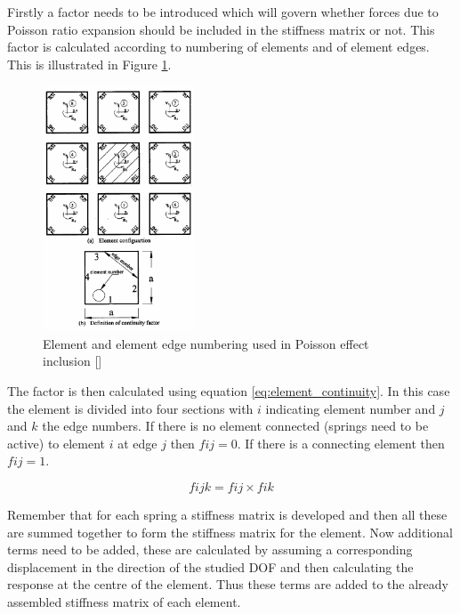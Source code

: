 Firstly a factor needs to be introduced which will govern whether forces due to Poisson ratio expansion should be included in the stiffness matrix or not.  This factor is calculated according to numbering of elements and of element edges.  This is illustrated in Figure \ref{fig:Poisson_element_numbering_AEM}.

\begin{figure}[H]
\centering
\includegraphics[width=0.4\textwidth]{../Poisson_element_numbering_AEM.png}
\caption{Element and element edge numbering used in Poisson effect inclusion [\cite{First_AEM}]}
\label{fig:Poisson_element_numbering_AEM}
\end{figure}

The factor is then calculated using equation \ref{eq:element_continuity}.  In this case the element is divided into four sections with $i$ indicating element number and $j$ and $k$ the edge numbers.  If there is no element connected (springs need to be active) to element $i$ at edge $j$ then $fij=0$.  If there is a connecting element then $fij=1$.  

\begin{equation}
fijk = fij \times fik
\label{eq:element_continuity}
\end{equation}

Remember that for each spring a stiffness matrix is developed and then all these are summed together to form the stiffness matrix for the element.  Now additional terms need to be added, these are calculated by assuming a corresponding displacement in the direction of the studied DOF and then calculating the response at the centre of the element.  Thus these terms are added to the already assembled stiffness matrix of each element. 

